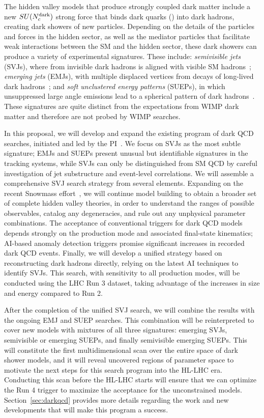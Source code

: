 The hidden valley models that produce strongly coupled dark matter include a new $SU(N_{c}^{\text{dark}})$ strong force that binds dark quarks (\Pqdark) into dark hadrons, creating dark showers of new particles.
Depending on the details of the particles and forces in the hidden sector,
as well as the mediator particles that facilitate weak interactions between the SM and the hidden sector,
these dark showers can produce a variety of experimental signatures.
These include: \emph{semivisible jets} (SVJs), where \met from invisible dark hadrons is aligned with visible SM hadrons~\cite{Cohen:2015toa};
\emph{emerging jets} (EMJs), with multiple displaced vertices from decays of long-lived dark hadrons~\cite{Schwaller:2015gea};
and \emph{soft unclustered energy patterns} (SUEPs), in which unsuppressed large angle emissions lead to a spherical pattern of dark hadrons~\cite{Knapen:2016hky}.
These signatures are quite distinct from the expectations from WIMP dark matter and therefore are not probed by WIMP searches.

In this proposal, we will develop and expand the existing program of dark QCD searches, initiated and led by the PI~\cite{Sirunyan:2018njd,CMS:2021dzg,CMS:2024nca,CMS:2024gxp}.
We focus on SVJs as the most subtle signature; EMJs and SUEPs present unusual but identifiable signatures in the tracking systems,
while SVJs can only be distinguished from SM QCD by careful investigation of jet substructure and event-level correlations.
We will assemble a comprehensive SVJ search strategy from several elements.
Expanding on the recent Snowmass effort~\cite{Albouy:2022cin}, we will continue model building to obtain a broader set of complete hidden valley theories,
in order to understand the ranges of possible observables, catalog any degeneracies, and rule out any unphysical parameter combinations.
The acceptance of conventional triggers for dark QCD models depends strongly on the production mode and associated final-state kinematics;
AI-based anomaly detection triggers promise significant increases in recorded dark QCD events.
Finally, we will develop a unified strategy based on reconstructing dark hadrons directly, relying on the latest AI techniques to identify SVJs.
This search, with sensitivity to all production modes, will be conducted using the LHC Run 3 dataset, taking advantage of the increases in size and energy compared to Run 2.

After the completion of the unified SVJ search, we will combine the results with the ongoing EMJ and SUEP searches.
This combination will be reinterpreted to cover new models with mixtures of all three signatures: emerging SVJs, semivisible or emerging SUEPs, and finally semivisible emerging SUEPs.
This will constitute the first multidimensional scan over the entire space of dark shower models,
and it will reveal uncovered regions of parameter space to motivate the next steps for this search program into the HL-LHC era.
Conducting this scan before the HL-LHC starts will ensure that we can optimize the Run 4 trigger to maximize the acceptance for the unconstrained models.
Section~\ref{sec:darkqcd} provides more details regarding the work and new developments that will make this program a success.

